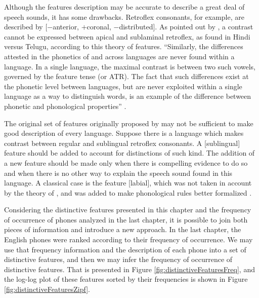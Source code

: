 Although the features description may be accurate to describe a great deal of speech sounds, it has some drawbacks. Retroflex consonants, for example, are described by [$-$anterior, $+$coronal, $-$distributed]. As pointed out by \cite{odden2005}, a contrast cannot be expressed between apical and sublaminal retroflex, as found in Hindi versus Telugu, according to this theory of features. ``Similarly, the differences attested in the phonetics of \textipa{[u]} and \textipa{[U]} across languages are never found within a language. In a single language, the maximal contrast is between two such vowels, governed by the feature tense (or ATR). The fact that such differences exist at the phonetic level between languages, but are never exploited within a single language as a way to distinguish words, is an example of the difference between phonetic and phonological properties'' \citep{odden2005}.

The original set of features originally proposed by \cite{chomsky1968a} may not be sufficient to make good description of every language. Suppose there is a language which makes contrast between regular and sublingual retroflex consonants. A [sublingual] feature should be added to account for distinctions of such kind. The addition of a new feature should be made only when there is compelling evidence to do so and when there is no other way to explain the speech sound found in this language. A classical case is the feature [labial], which was not taken in account by the theory of \cite{chomsky1968a}, and was added to make phonological rules better formalized \citep{odden2005}.



Considering the distinctive features presented in this chapter and the frequency of occurrence of phones analyzed in the last chapter, it is possible to join both pieces of information and introduce a new approach. In the last chapter, the English phones were ranked according to their frequency of occurrence. We may use that frequency information and the description of each phone into a set of distinctive features, and then we may infer the frequency of occurrence of distinctive features. That is presented in Figure \ref{fig:distinctiveFeaturesFreq}, and the log-log plot of these features sorted by their frequencies is shown in Figure \ref{fig:distinctiveFeaturesZipf}.

